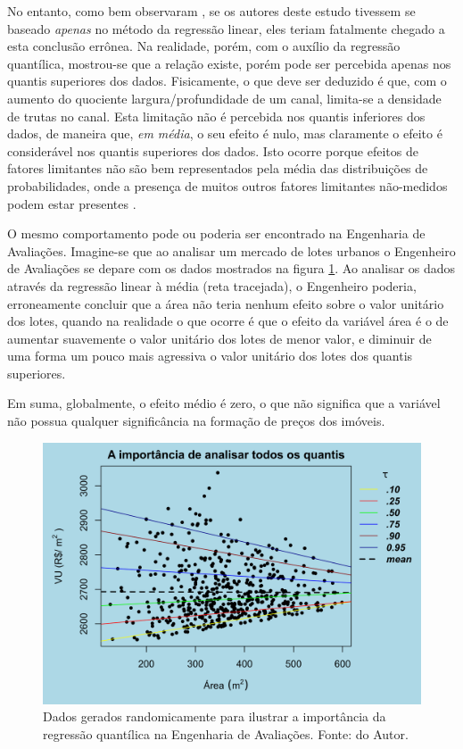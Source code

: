 \documentclass[a4paper, 12pt]{article}
\begin{document}
No entanto, como bem observaram \textcite[412-413]{QReco}, se os autores
deste estudo tivessem se baseado \emph{apenas} no método da regressão
linear, eles teriam fatalmente chegado a esta conclusão errônea. Na
realidade, porém, com o auxílio da regressão quantílica, mostrou-se que
a relação existe, porém pode ser percebida apenas nos quantis superiores
dos dados. Fisicamente, o que deve ser deduzido é que, com o aumento do
quociente largura/profundidade de um canal, limita-se a densidade de
trutas no canal. Esta limitação não é percebida nos quantis inferiores
dos dados, de maneira que, \emph{em média}, o seu efeito é nulo, mas
claramente o efeito é considerável nos quantis superiores dos dados.
Isto ocorre porque efeitos de fatores limitantes não são bem
representados pela média das distribuições de probabilidades, onde a
presença de muitos outros fatores limitantes não-medidos podem estar
presentes \cite[413]{QReco}.

O mesmo comportamento pode ou poderia ser encontrado na Engenharia de
Avaliações. Imagine-se que ao analisar um mercado de lotes urbanos o
Engenheiro de Avaliações se depare com os dados mostrados na figura
\ref{fig:urb}. Ao analisar os dados através da regressão linear à média
(reta tracejada), o Engenheiro poderia, erroneamente concluir que a área
não teria nenhum efeito sobre o valor unitário dos lotes, quando na
realidade o que ocorre é que o efeito da variável área é o de aumentar
suavemente o valor unitário dos lotes de menor valor, e diminuir de uma
forma um pouco mais agressiva o valor unitário dos lotes dos quantis
superiores.

Em suma, globalmente, o efeito médio é zero, o que não significa que a
variável não possua qualquer significância na formação de preços dos
imóveis.

\begin{figure}[H]

{\centering \includegraphics[width=1\linewidth]{images/urb-1} 

}

\caption{Dados gerados randomicamente para ilustrar a importância da regressão quantílica na Engenharia de Avaliações. Fonte: do Autor.}\label{fig:urb}
\end{figure}
\end{document}
